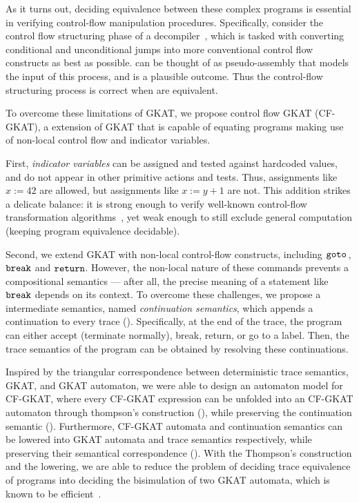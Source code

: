 As it turns out, deciding equivalence between these complex programs is essential in verifying control-flow manipulation procedures.
Specifically, consider the control flow structuring phase of a decompiler~\cite{cifuentes-1994}, which is tasked with converting conditional and unconditional jumps into more conventional control flow constructs as best as possible.
 can be thought of as pseudo-assembly that models the input of this process, and  is a plausible outcome.
Thus the control-flow structuring process is correct when  are equivalent.

To overcome these limitations of GKAT, we propose control flow GKAT (CF-GKAT), a extension of GKAT that is capable of equating programs making use of non-local control flow and indicator variables.

First, \emph{indicator variables} can be assigned and tested against hardcoded values, and do not appear in other primitive actions and tests.
Thus, assignments like $x := 42$ are allowed, but assignments like $x := y + 1$ are not.
This addition strikes a delicate balance: it is strong enough to verify well-known control-flow transformation algorithms~\cite{yakdan_NoMoreGotos_2015,erosa-hendren-1994}, yet weak enough to still exclude general computation (keeping program equivalence decidable).

Second, we extend GKAT with non-local control-flow constructs, including \(\mathtt{goto}~\!\), \(\mathtt{break}\) and \(\mathtt{return}\).
However, the non-local nature of these commands prevents a compositional semantics --- after all, the precise meaning of a statement like \(\mathtt{break}\) depends on its context.
To overcome these challenges, we propose a intermediate semantics, named \emph{continuation semantics}, which appends a continuation to every trace (). 
Specifically, at the end of the trace, the program can either accept (terminate normally), break, return, or go to a label.
Then, the trace semantics of the program can be obtained by resolving these continuations.

Inspired by the triangular correspondence between deterministic trace semantics, GKAT, and GKAT automaton, we were able to design an automaton model for CF-GKAT, where every CF-GKAT expression can be unfolded into an CF-GKAT automaton through thompson's construction (), while preserving the continuation semantic (). 
Furthermore, CF-GKAT automata and continuation semantics can be lowered into GKAT automata and trace semantics respectively, while preserving their semantical correspondence (). 
With the Thompson's construction and the lowering, we are able to reduce the problem of deciding trace equivalence of programs into deciding the bisimulation of two GKAT automata, which is known to be efficient~\cite{Smolka_Foster_Hsu_Kappé_Kozen_Silva_2020}. 

